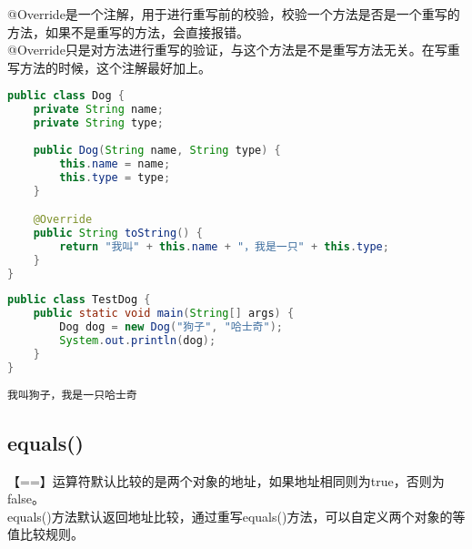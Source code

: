@Override是一个注解，用于进行重写前的校验，校验一个方法是否是一个重写的方法，如果不是重写的方法，会直接报错。 \\

@Override只是对方法进行重写的验证，与这个方法是不是重写方法无关。在写重写方法的时候，这个注解最好加上。 \\


\begin{lstlisting}[language=Java, title=Dog.java]
public class Dog {
    private String name;
    private String type;
    
    public Dog(String name, String type) {
        this.name = name;
        this.type = type;
    }

    @Override
    public String toString() {
        return "我叫" + this.name + "，我是一只" + this.type;
    }
}
\end{lstlisting}

\begin{lstlisting}[language=Java, title=TestDog.java]
public class TestDog {
    public static void main(String[] args) {
        Dog dog = new Dog("狗子", "哈士奇");
        System.out.println(dog);
    }
}
\end{lstlisting}

\begin{tcolorbox}
	\begin{verbatim}
我叫狗子，我是一只哈士奇
	\end{verbatim}
\end{tcolorbox}

\subsection{equals()}

【==】运算符默认比较的是两个对象的地址，如果地址相同则为true，否则为false。 \\

equals()方法默认返回地址比较，通过重写equals()方法，可以自定义两个对象的等值比较规则。 \\


